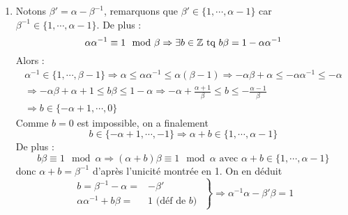 \begin{enumerate}
\begin{enumerate}
\item Notons $\beta' = \alpha - \beta^{-1}$, remarquons que $\beta'\in \{1,\cdots,\alpha-1\}$ car $\beta^{-1}\in\{1,\cdots,\alpha -1 \}$. De plus :
\begin{displaymath}
 \alpha \alpha^{-1}\equiv 1 \mod{\beta} \Rightarrow \exists b\in \mathbb{Z} \text{ tq } b\beta = 1 -\alpha \alpha^{-1}
\end{displaymath}
Alors :
\begin{multline*}
 \alpha^{-1}\in \{1,\cdots,\beta -1\}
\Rightarrow \alpha \leq \alpha \alpha^{-1}\leq \alpha(\beta -1)
\Rightarrow -\alpha \beta +\alpha \leq -\alpha \alpha^{-1} \leq -\alpha \\
\Rightarrow -\alpha \beta +\alpha +1 \leq b \beta \leq 1 -\alpha 
\Rightarrow -\alpha + \frac{\alpha +1}{\beta} \leq b \leq - \frac{\alpha -1}{\beta} \\
\Rightarrow b\in \{-\alpha +1,\cdots,0\}
\end{multline*}
Comme $b=0$ est impossible, on a finalement
\begin{displaymath}
b\in \{-\alpha +1,\cdots,-1\}\Rightarrow \alpha + b \in \{1,\cdots,\alpha -1\} 
\end{displaymath}
De plus :
\begin{displaymath}
 b\beta \equiv 1 \mod{\alpha} \Rightarrow  (\alpha+b)\beta \equiv 1 \mod{\alpha} \text{ avec } \alpha + b \in \{1,\cdots,\alpha -1\} 
\end{displaymath}
donc $\alpha + b = \beta^{-1}$ d'après l'unicité montrée en 1. On en déduit
\begin{displaymath}
 \left. 
 \begin{aligned}
 b=\beta^{-1}-\alpha =& -\beta'\\
 \alpha \alpha^{-1} + b\beta =& 1 \text{ (déf de $b$) }
 \end{aligned}
\right\rbrace 
  \Rightarrow \alpha^{-1}\alpha -\beta'\beta =1
\end{displaymath}


\end{enumerate}
\end{enumerate}
